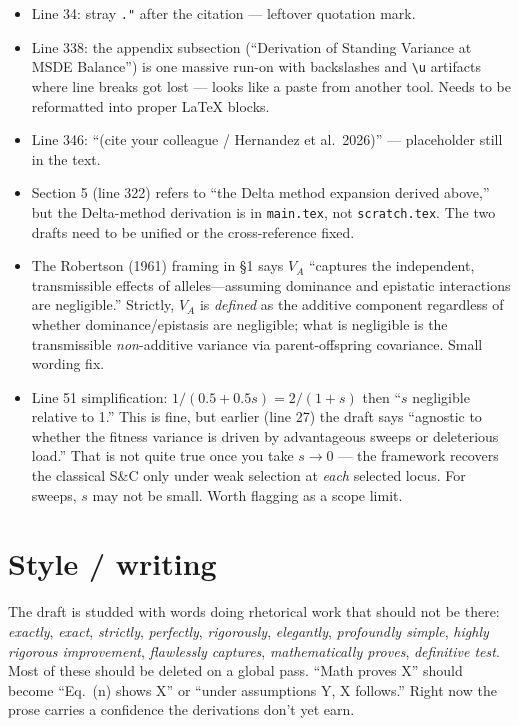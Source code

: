 \documentclass[11pt]{article}
\begin{document}
\begin{itemize}
\item Line 34: stray \verb|."| after the citation --- leftover quotation mark.
\item Line 338: the appendix subsection (``Derivation of Standing
Variance at MSDE Balance'') is one massive run-on with backslashes and
\verb|\u| artifacts where line breaks got lost --- looks like a paste
from another tool. Needs to be reformatted into proper LaTeX blocks.
\item Line 346: ``(cite your colleague / Hernandez et al.\ 2026)''
--- placeholder still in the text.
\item Section 5 (line 322) refers to ``the Delta method expansion
derived above,'' but the Delta-method derivation is in
\texttt{main.tex}, not \texttt{scratch.tex}. The two drafts need to be
unified or the cross-reference fixed.
\item The Robertson (1961) framing in \S 1 says $V_A$ ``captures the
independent, transmissible effects of alleles---assuming dominance and
epistatic interactions are negligible.'' Strictly, $V_A$ is
\emph{defined} as the additive component regardless of whether
dominance/epistasis are negligible; what is negligible is the
transmissible \emph{non}-additive variance via parent-offspring
covariance. Small wording fix.
\item Line 51 simplification: $1/(0.5 + 0.5s) = 2/(1+s)$ then ``$s$
negligible relative to 1.'' This is fine, but earlier (line 27) the
draft says ``agnostic to whether the fitness variance is driven by
advantageous sweeps or deleterious load.'' That is not quite true
once you take $s\to 0$ --- the framework recovers the classical S\&C
only under weak selection at \emph{each} selected locus. For sweeps,
$s$ may not be small. Worth flagging as a scope limit.
\end{itemize}

\section{Style / writing}

The draft is studded with words doing rhetorical work that should not
be there: \emph{exactly}, \emph{exact}, \emph{strictly},
\emph{perfectly}, \emph{rigorously}, \emph{elegantly},
\emph{profoundly simple}, \emph{highly rigorous improvement},
\emph{flawlessly captures}, \emph{mathematically proves},
\emph{definitive test}. Most of these should be deleted on a global
pass. ``Math proves X'' should become ``Eq.~(n) shows X'' or ``under
assumptions Y, X follows.'' Right now the prose carries a confidence
the derivations don't yet earn.
\end{document}

